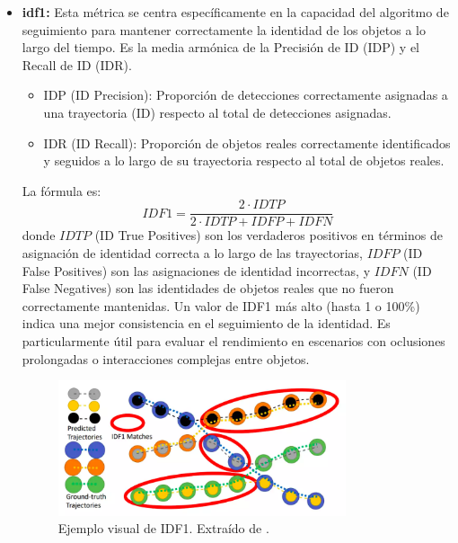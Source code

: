 \documentclass[11pt,spanish,listoffigures,listoftables]{tfgetsinf}
\begin{document}
\begin{itemize}
   \item \textbf{\gls{idf1}:} Esta métrica se centra específicamente en la capacidad del algoritmo de seguimiento para mantener correctamente la identidad de los objetos a lo largo del tiempo. Es la media armónica de la Precisión de ID (IDP) y el Recall de ID (IDR).
   \begin{itemize}
     \item IDP (ID Precision): Proporción de detecciones correctamente asignadas a una trayectoria (ID) respecto al total de detecciones asignadas.
     \item IDR (ID Recall): Proporción de objetos reales correctamente identificados y seguidos a lo largo de su trayectoria respecto al total de objetos reales.
   \end{itemize}
   La fórmula es:
   \begin{equation}
   IDF1 = \frac{2 \cdot IDTP}{2 \cdot IDTP + IDFP + IDFN}
   \end{equation}
   donde \(IDTP\) (ID True Positives) son los verdaderos positivos en términos de asignación de identidad correcta a lo largo de las trayectorias, \(IDFP\) (ID False Positives) son las asignaciones de identidad incorrectas, y \(IDFN\) (ID False Negatives) son las identidades de objetos reales que no fueron correctamente mantenidas. Un valor de IDF1 más alto (hasta 1 o 100\%) indica una mejor consistencia en el seguimiento de la identidad. Es particularmente útil para evaluar el rendimiento en escenarios con oclusiones prolongadas o interacciones complejas entre objetos.


   \begin{figure}[H]
      \centering
      \includegraphics[width=0.8\textwidth]{images/estado_del_arte/IDF1.png}
      \caption[Ejemplo visual de IDF1]{Ejemplo visual de IDF1. Extraído de \cite[fig. 10, p.~20]{idf1}.}
      \label{fig:idf1_example}      
   \end{figure}




\end{itemize}
\end{document}
